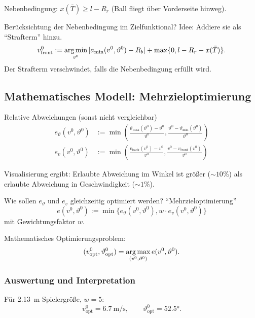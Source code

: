 Nebenbedingung: $x(\bar{T}) \ge l - R_r$ (Ball fliegt über Vorderseite hinweg).

Berücksichtung der Nebenbedingung im Zielfunktional? Idee: Addiere sie als
``Strafterm'' hinzu.
\[ v^0_{\text{front}}
  := \operatorname*{arg\,min}_{v^0} | a_{\min}(v^0, \vartheta^0) - R_b | + \max \{ 0, l - R_r -
  x(\bar{T})\}. \]
Der Strafterm verschwindet, falls die Nebenbedingung erfüllt wird.

\subsection{Mathematisches Modell: Mehrzieloptimierung}
Relative Abweichungen (sonst nicht vergleichbar)
\[ \begin{aligned}
    e_\vartheta(v^0, \vartheta^0) &:= \min \left(
      \frac{\vartheta_{\max}(\vartheta^0) - \vartheta^0}{\vartheta^0},
      \frac{\vartheta^0 - \vartheta_{\min}(\vartheta^0)}{\vartheta^0}
    \right) \\
    e_v(v^0, \vartheta^0) &:= \min \left(
      \frac{v_{\text{back}}(v^0) - v^0}{v^0},
      \frac{v^0 - v_{\text{front}}(v^0)}{v^0}
    \right)
  \end{aligned} \]

Visualisierung ergibt: Erlaubte Abweichung im Winkel ist größer ($\sim 10
\%$) als erlaubte Abweichung in Geschwindigkeit ($\sim 1 \%$).

Wie sollen $e_\vartheta$ und $e_v$ gleichzeitig optimiert werden?
``Mehrzieloptimierung''
\[ e( v^0, \vartheta^0 ) := \min \{ e_\vartheta(v^0, \vartheta^0), w \cdot
  e_v(v^0, \vartheta^0) \} \]
mit Gewichtungsfaktor $w$.

Mathematisches Optimierungsproblem:
\[ (v^0_{\text{opt}}, \vartheta^0_{\text{opt}}) = \operatorname*{arg\,max}_{(v^0, \vartheta^0)}
  e(v^0, \vartheta^0). \]

\subsubsection*{Auswertung und Interpretation}
Für \SI{2.13}{\m} Spielergröße, $w = 5$:
\[ v^0_{\text{opt}} = \SI{6.7}{\m \per \s}, \qquad \vartheta^0_{\text{opt}} =
  \ang{52.5}. \]